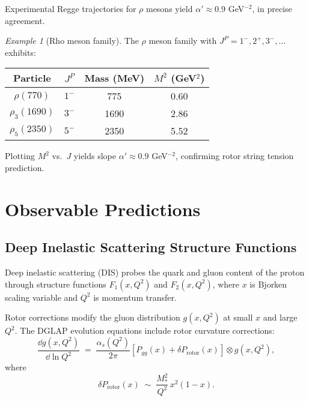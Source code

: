 \documentclass[11pt,a4paper]{article}
\theoremstyle{definition}
\theoremstyle{plain}
\theoremstyle{remark}
\newtheorem{example}{Example}[section]
\begin{document}
Experimental Regge trajectories for $\rho$ mesons yield $\alpha' \approx 0.9$ GeV$^{-2}$, in precise agreement.

\begin{example}[Rho meson family]
The $\rho$ meson family with $J^P = 1^-, 2^+, 3^-, \ldots$ exhibits:
\begin{center}
\begin{tabular}{cccc}
\toprule
Particle & $J^P$ & Mass (MeV) & $M^2$ (GeV$^2$) \\
\midrule
$\rho(770)$    & $1^-$ & 775  & 0.60 \\
$\rho_3(1690)$ & $3^-$ & 1690 & 2.86 \\
$\rho_5(2350)$ & $5^-$ & 2350 & 5.52 \\
\bottomrule
\end{tabular}
\end{center}
Plotting $M^2$ vs.\ $J$ yields slope $\alpha' \approx 0.9$ GeV$^{-2}$, confirming rotor string tension prediction.
\end{example}

\vspace{1em}

\section{Observable Predictions}
\label{sec:observables}

\subsection{Deep Inelastic Scattering Structure Functions}

Deep inelastic scattering (DIS) probes the quark and gluon content of the proton through structure functions $F_1(x,Q^2)$ and $F_2(x,Q^2)$, where $x$ is Bjorken scaling variable and $Q^2$ is momentum transfer.

Rotor corrections modify the gluon distribution $g(x,Q^2)$ at small $x$ and large $Q^2$. The DGLAP evolution equations include rotor curvature corrections:
\begin{equation}
\frac{\dd g(x,Q^2)}{\dd \ln Q^2} \;=\; \frac{\alpha_s(Q^2)}{2\pi}\left[P_{gg}(x) + \delta P_{\mathrm{rotor}}(x)\right] \otimes g(x,Q^2),
\end{equation}
where
\begin{equation}
\delta P_{\mathrm{rotor}}(x) \;\sim\; \frac{M_\ast^2}{Q^2}\,x^2(1-x).
\end{equation}
\end{document}
